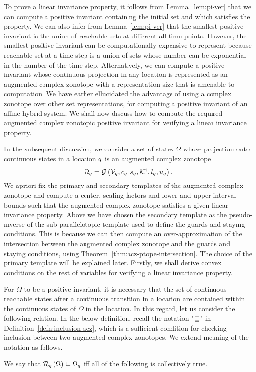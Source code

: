 To prove a linear invariance property, it follows from
Lemma~\ref{lem:pi-ver} that we can compute a positive invariant
containing the initial set and which satisfies the property.  We can
also infer from Lemma~\ref{lem:pi-ver} that the smallest positive
invariant is the union of reachable sets at different all time points.
However, the smallest positive invariant can be computationally
expensive to represent because reachable set at a time step is a union
of sets whose number can be exponential in the number of the time
step.  Alternatively, we can compute a positive invariant whose
continuous projection in any location is represented as an augmented
complex zonotope with a representation size that is amenable to
computation.  We have earlier ellucidated the advantage of using a
complex zonotope over other set representations, for computing a
positive invariant of an affine hybrid system.  We shall now discuss
how to compute the required augmented complex zonotopic positive
invariant for verifying a linear invariance property.

In the subsequent discussion, we consider a set of states $\Omega$ whose
projection onto continuous states in a location $q$ is an augmented
complex zonotope
%
\[
\Omega_q=\mathcal{G}\left(\mathcal{V}_q,c_q,s_q,{\mathcal{K}}^\dagger,l_q,u_q\right).
\]
%
We apriori fix the primary and secondary templates of the augmented
complex zonotope and compute a center, scaling factors and lower and
upper interval bounds such that the augmented complex zonotope
satisfies a given linear invariance property.  Above we have chosen
the secondary template as the pseudo-inverse of the sub-parallelotopic
template used to define the guards and staying conditions.  This is
because we can then compute an over-approximation of the intersection
between the augmented complex zonotope and the guards and staying
conditions, using Theorem~\ref{thm:acz-ptope-intersection}.  The choice
of the primary template will be explained later.  Firstly, we shall
derive convex conditions on the rest of variables for verifying a
linear invariance property.


For $\Omega$ to be a positive invariant, it is necessary that the set
of continuous reachable states after a continuous transition in a
location are contained within the continuous states of $\Omega$ in the
location.  In this regard, let us consider the following relation.  In
the below definition, recall the notation "$\sqsubseteq$" in
Definition~\ref{defn:inclusion-acz}, which is a sufficient condition
for checking inclusion between two augmented complex zonotopes.  We
extend meaning of the notation as follows.
%
\begin{definition}
We say that $\mathcal{R}_{q}\left(\Omega\right)\sqsubseteq\Omega_q$ iff all of the
following is collectively true.
%
\begin{align*}

\end{align*}
%
\end{definition}
% 